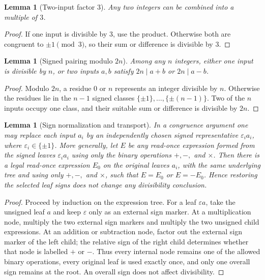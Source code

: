 \documentclass[11pt]{amsart}
\newtheorem{lemma}[theorem]{Lemma}
\theoremstyle{definition}
\theoremstyle{remark}
\begin{document}
\begin{lemma}[Two-input factor $3$]\label{lem:pair3}
Any two integers can be combined into a multiple of $3$.
\end{lemma}
\begin{proof}
If one input is divisible by $3$, use the product.  Otherwise both are
congruent to $\pm1\pmod3$, so their sum or difference is divisible by $3$.
\end{proof}

\begin{lemma}[Signed pairing modulo $2n$]\label{lem:signedpair}
Among any $n$ integers, either one input is divisible by $n$, or two inputs
$a,b$ satisfy $2n\mid a+b$ or $2n\mid a-b$.
\end{lemma}
\begin{proof}
Modulo $2n$, a residue $0$ or $n$ represents an integer divisible by $n$.
Otherwise the residues lie in the $n-1$ signed classes
$\{\pm1\},\dots,\{\pm(n-1)\}$.  Two of the $n$ inputs occupy one class, and
their suitable sum or difference is divisible by $2n$.
\end{proof}

\begin{lemma}[Sign normalization and transport]\label{lem:signnorm}
In a congruence argument one may replace each input $a_i$ by an independently
chosen signed representative $\varepsilon_i a_i$, where
$\varepsilon_i\in\{\pm1\}$.  More generally, let $E$ be any read-once
expression formed from the signed leaves $\varepsilon_i a_i$ using only the
binary operations $+,-,$ and $\times$.  Then there is a legal read-once
expression $E_0$ on the original leaves $a_i$, with the same underlying tree
and using only $+,-,$ and $\times$, such that $E=E_0$ or $E=-E_0$.  Hence
restoring the selected leaf signs does not change any divisibility conclusion.
\end{lemma}
\begin{proof}
Proceed by induction on the expression tree.  For a leaf $\varepsilon a$,
take the unsigned leaf $a$ and keep $\varepsilon$ only as an external sign
marker.  At a multiplication node, multiply the two external sign markers
and multiply the two unsigned child expressions.  At an addition or
subtraction node, factor out the external sign marker of the left child; the
relative sign of the right child determines whether that node is labelled
$+$ or $-$.  Thus every internal node remains one of the allowed binary
operations, every original leaf is used exactly once, and only one overall
sign remains at the root.  An overall sign does not affect divisibility.
\end{proof}
\end{document}
